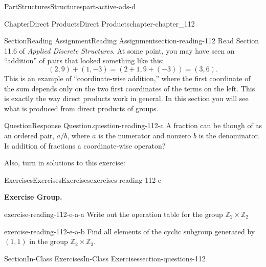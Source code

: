 \documentclass[oneside,10pt,]{book}
\numberwithin{equation}{section}
\begin{document}
\begin{partptx}{Part}{Structures}{}{Structures}{}{}{part-active-ads-d}
\begin{chapterptx}{Chapter}{Direct Products}{}{Direct Products}{}{}{chapter-chapter_112}
\begin{sectionptx}{Section}{Reading Assignment}{}{Reading Assignment}{}{}{section-reading-112}
Read Section 11.6 of \emph{Applied Discrete Structures}. At some point, you may have seen an ``addition'' of pairs that looked something like this:%
\begin{equation*}
(2,9)+(1,-3) = (2+1,9+(-3))=(3,6).
\end{equation*}
This is an example of ``coordinate-wise addition,'' where the first coordinate of the sum depends only on the two first coordinates of the terms on the left. This is exactly the way direct products work in general. In this section you will see what is produced from direct products of groups.%
\begin{question}{Question}{Response Question.}{question-reading-112-c}%
A fraction can be though of as an ordered pair, \(a/b\), where \(a\) is the numerator and nonzero \(b\) is the denominator.  Is addition of fractions a coordinate-wise operaton?%
\end{question}
Also, turn in solutions to this exercise:%
%
%
\typeout{************************************************}
\typeout{************************************************}
%
\begin{exercises-subsection-numberless}{Exercises}{Exercises}{}{Exercises}{}{}{exercises-reading-112-e}
\par\medskip\noindent%
\textbf{Exercise Group.}\space\space%
\begin{exercisegroup}
\begin{divisionexerciseeg}{1}{}{}{exercise-reading-112-e-a-a}%
Write out the operation table for the group \(\mathbb{Z}_2 \times \mathbb{Z}_2\)%
\end{divisionexerciseeg}%
\begin{divisionexerciseeg}{2}{}{}{exercise-reading-112-e-a-b}%
Find all elements of the cyclic subgroup generated by \((1,1)\) in the group \(\mathbb{Z}_2 \times \mathbb{Z}_3\).%
\end{divisionexerciseeg}%
\end{exercisegroup}
\par\medskip\noindent
\end{exercises-subsection-numberless}
\end{sectionptx}
%
%
\typeout{************************************************}
\typeout{************************************************}
%
\begin{sectionptx}{Section}{In-Class Exercises}{}{In-Class Exercises}{}{}{section-questions-112}
%
%
%
\typeout{************************************************}

\end{sectionptx}
\end{chapterptx}
\end{partptx}
\end{document}
